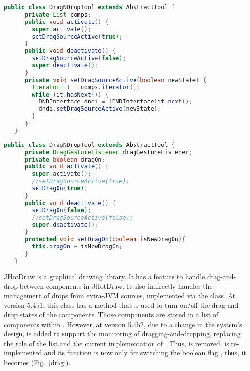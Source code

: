 \begin{figure*}[t]
\hfill
\begin{minipage}[t]{.45\textwidth}
\begin{lstlisting}[language = Java]
    public class DragNDropTool extends AbstractTool {
      private List comps;
      public void activate() {
        super.activate();
        setDragSourceActive(true);
      }
      public void deactivate() {
        setDragSourceActive(false);
        super.deactivate();
      }
      private void setDragSourceActive(boolean newState) {
        Iterator it = comps.iterator();
        while (it.hasNext()) {
          DNDInterface dndi = (DNDInterface)it.next();
          dndi.setDragSourceActive(newState);
        }
      }
   }
\end{lstlisting}
\end{minipage}
\hfill
\begin{minipage}[t]{.45\textwidth}
\begin{lstlisting}[language = Java]
    public class DragNDropTool extends AbstractTool {
      private DragGestureListener dragGestureListener;
      private boolean dragOn;	
      public void activate() {
        super.activate();
        //setDragSourceActive(true);
        setDragOn(true);
      }
      public void deactivate() {
        setDragOn(false);
        //setDragSourceActive(false);
        super.deactivate();
      }
      protected void setDragOn(boolean isNewDragOn){
        this.dragOn = isNewDragOn;
      }
   }	
\end{lstlisting}
\end{minipage}
\hfill
\caption{Method changes both in name and implementation but is used in the same way}
\label{drag}
\end{figure*}


JHotDraw is a graphical drawing library. It has a feature to handle
drag-and-drop between components in JHotDraw. It also indirectly
handles the management of drops from extra-JVM sources, implemented
via the  class. At version 5.4b1, this class has a
method  that is used to turn on/off the
drag-and-drop states of the components. Those components are stored in
a list of components  within
. However, at version 5.4b2, due to a change in
the system's design,  is added to support
the monitoring of dragging-and-dropping, replacing the role of the
list  and the current implementation of
. Thus,  is
removed.  is re-implemented and its
function is now only for switching the boolean flag
, thus, it becomes  (Fig.~\ref{drag}).

